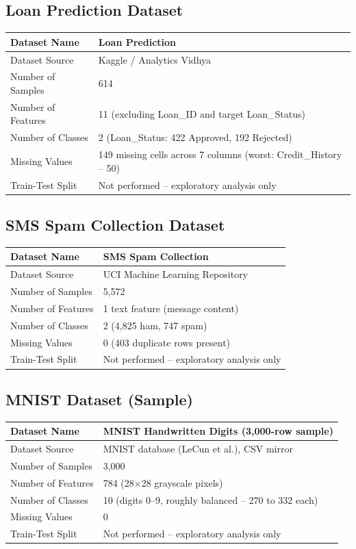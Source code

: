 \documentclass[12pt,a4paper]{article}
\begin{document}
\subsection*{Loan Prediction Dataset}
\begin{longtable}{|p{6cm}|p{8cm}|}
\hline
Dataset Name & Loan Prediction \\ \hline
Dataset Source & Kaggle / Analytics Vidhya \\ \hline
Number of Samples & 614 \\ \hline
Number of Features & 11 (excluding Loan\_ID and target Loan\_Status) \\ \hline
Number of Classes & 2 (Loan\_Status: 422 Approved, 192 Rejected) \\ \hline
Missing Values & 149 missing cells across 7 columns (worst: Credit\_History -- 50) \\ \hline
Train-Test Split & Not performed -- exploratory analysis only \\ \hline
\end{longtable}

\subsection*{SMS Spam Collection Dataset}
\begin{longtable}{|p{6cm}|p{8cm}|}
\hline
Dataset Name & SMS Spam Collection \\ \hline
Dataset Source & UCI Machine Learning Repository \\ \hline
Number of Samples & 5,572 \\ \hline
Number of Features & 1 text feature (message content) \\ \hline
Number of Classes & 2 (4,825 ham, 747 spam) \\ \hline
Missing Values & 0 (403 duplicate rows present) \\ \hline
Train-Test Split & Not performed -- exploratory analysis only \\ \hline
\end{longtable}

\subsection*{MNIST Dataset (Sample)}
\begin{longtable}{|p{6cm}|p{8cm}|}
\hline
Dataset Name & MNIST Handwritten Digits (3,000-row sample) \\ \hline
Dataset Source & MNIST database (LeCun et al.), CSV mirror \\ \hline
Number of Samples & 3,000 \\ \hline
Number of Features & 784 (28$\times$28 grayscale pixels) \\ \hline
Number of Classes & 10 (digits 0--9, roughly balanced -- 270 to 332 each) \\ \hline
Missing Values & 0 \\ \hline
Train-Test Split & Not performed -- exploratory analysis only \\ \hline
\end{longtable}
\end{document}
